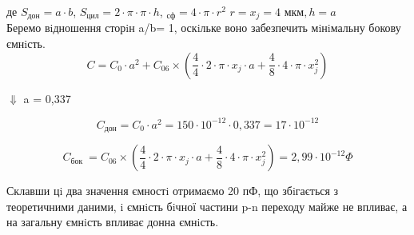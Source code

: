 \documentclass[a4paper,14pt]{extreport}
\begin{document}
де $S_{\text{дон}} = a\cdot b$, $S_{\text{цил}} = 2\cdot \pi \cdot \pi \cdot h$, $_{\text{сф}} = 4\cdot \pi \cdot r^2$ $r = x_j = 4 \text{ мкм}, h = a$\\

Беремо вiдношення сторiн a/b= 1, оскiльке воно забезпечить мiнiмальну
бокову ємнiсть.
$$
C=C_{0} \cdot a^{2}+C_{06} \times\left(\frac{4}{4} \cdot 2 \cdot \pi \cdot x_{j} \cdot a+\frac{4}{8} \cdot 4 \cdot \pi \cdot x_{j}^{2}\right)
$$
\begin{center}
$\Downarrow$
a = 0,337
\end{center}
$$C_{\text{дон}} = C_0 \cdot a^2 = 150 \cdot 10^{-12} \cdot 0,337= 17 \cdot 10^{-12}$$

$$
C_{\text {бок }}=C_{06} \times\left(\frac{4}{4} \cdot 2 \cdot \pi \cdot x_{j} \cdot a+\frac{4}{8} \cdot 4 \cdot \pi \cdot x_{j}^{2}\right)=2,99 \cdot 10^{-12} \Phi
$$

Склавши цi два значення ємностi отримаємо 20 пФ, що збiгається з теоретичними даними, i ємнiсть бiчної частини p-n переходу майже не впливає, а на загальну ємнiсть впливає донна ємнiсть.
















\end{document}
